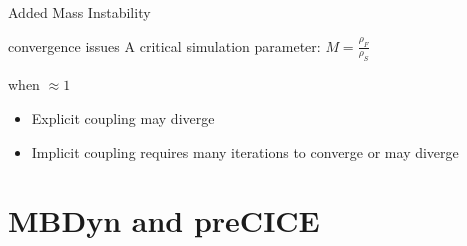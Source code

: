 \documentclass[10pt,t]{beamer}
\begin{document}
\begin{frame}{Added Mass Instability}
\label{addedmass}
\begin{alertblock}{convergence issues}
A critical simulation parameter:
$
    M = \frac{\rho_F}{\rho_S}
$

when $\approx 1$

\end{alertblock}

\vspace{0.8cm}

    \begin{itemize}
        \item Explicit coupling may diverge
        \item Implicit coupling requires many iterations to converge or may diverge 
    \end{itemize}

\vspace{0.8cm}


\hyperlink{dimensionless}{}

\end{frame}





\section{MBDyn and preCICE}
\end{document}
